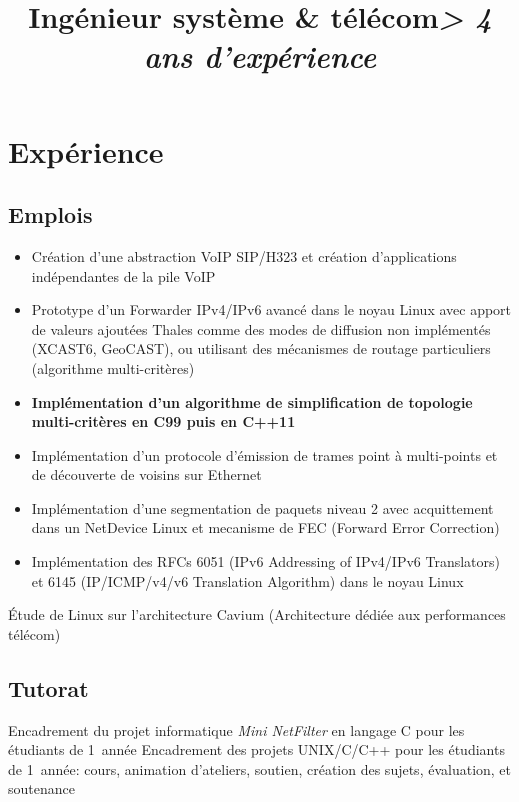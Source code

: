 \documentclass[11pt, a4paper]{moderncv}
\title{\textbf{Ingénieur système \& télécom}\newline \Large{\textit{> 4 ans d'expérience}}}
\begin{document}
\maketitle

\section{Expérience}
\subsection{Emplois}
{
  \begin{itemize}
    \renewcommand{\labelitemi}{$\bullet$  }
    \item Création d'une abstraction VoIP SIP/H323 et création d'applications indépendantes de la
	pile VoIP
    \item Prototype d'un Forwarder IPv4/IPv6 avancé dans le noyau Linux avec apport de valeurs ajoutées
	Thales comme des modes de diffusion non implémentés (XCAST6, GeoCAST), ou utilisant des mécanismes
	de routage particuliers (algorithme multi-critères)
    \item \textbf{Implémentation d'un algorithme de simplification de topologie multi-critères en C99 puis en C++11}
    \item Implémentation d'un protocole d'émission de trames point \`a multi-points et de découverte
	de voisins sur Ethernet
    \item Implémentation d'une segmentation de paquets niveau 2 avec acquittement dans un NetDevice
	Linux et mecanisme de FEC (Forward Error Correction)
    \item Implémentation des RFCs 6051 (IPv6 Addressing of IPv4/IPv6 Translators) et 6145 (IP/ICMP/v4/v6
	Translation Algorithm) dans le noyau Linux
  \end{itemize}
}
{
  Étude de Linux sur l'architecture Cavium (Architecture dédiée aux performances télécom)
}

\subsection{Tutorat}
	      {Encadrement du projet informatique \textit{Mini NetFilter} en langage C pour les étudiants
		de 1\iere\ année}
	      {Encadrement des projets UNIX/C/C++ pour les étudiants de 1\iere\ année: cours,
		animation d'ateliers, soutien, création des sujets, évaluation, et soutenance}
\end{document}
